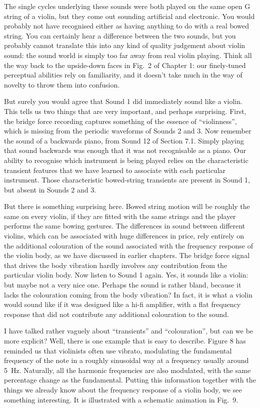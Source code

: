   The single cycles underlying these sounds were both played on the same open G 
  string of a violin, but they come out sounding artificial and electronic. You 
  would probably not have recognised either as having anything to do with a 
  real bowed string. You can certainly hear a difference between the two 
  sounds, but you probably cannot translate this into any kind of quality 
  judgement about violin sound: the sound world is simply too far away from 
  real violin playing. Think all the way back to the upside-down faces in Fig.\ 
  2 of Chapter 1: our finely-tuned perceptual abilities rely on familiarity, 
  and it doesn’t take much in the way of novelty to throw them into confusion. 

  But surely you would agree that Sound 1 did immediately sound like a violin. 
  This tells us two things that are very important, and perhaps surprising. 
  First, the bridge force recording captures something of the essence of 
  “violinness”, which is missing from the periodic waveforms of Sounds 2 and 3. 
  Now remember the sound of a backwards piano, from Sound 12 of Section 7.1. 
  Simply playing that sound backwards was enough that it was not recognisable 
  as a piano. Our ability to recognise which instrument is being played relies 
  on the characteristic transient features that we have learned to associate 
  with each particular instrument. Those characteristic bowed-string transients 
  are present in Sound 1, but absent in Sounds 2 and 3. 

  But there is something surprising here. Bowed string motion will be roughly 
  the same on every violin, if they are fitted with the same strings and the 
  player performs the same bowing gestures. The differences in sound between 
  different violins, which can be associated with huge differences in price, 
  rely entirely on the additional colouration of the sound associated with the 
  frequency response of the violin body, as we have discussed in earlier 
  chapters. The bridge force signal that drives the body vibration hardly 
  involves any contribution from the particular violin body. Now listen to 
  Sound 1 again. Yes, it sounds like a violin: but maybe not a very nice one. 
  Perhaps the sound is rather bland, because it lacks the colouration coming 
  from the body vibration? In fact, it is what a violin would sound like if it 
  was designed like a hi-fi amplifier, with a flat frequency response that did 
  not contribute any additional colouration to the sound. 

  I have talked rather vaguely about “transients” and “colouration”, but can we 
  be more explicit? Well, there is one example that is easy to describe. Figure 
  8 has reminded us that violinists often use vibrato, modulating the 
  fundamental frequency of the note in a roughly sinusoidal way at a frequency 
  usually around 5~Hz. Naturally, all the harmonic frequencies are also 
  modulated, with the same percentage change as the fundamental. Putting this 
  information together with the things we already know about the frequency 
  response of a violin body, we see something interesting. It is illustrated 
  with a schematic animation in Fig.\ 9. 

